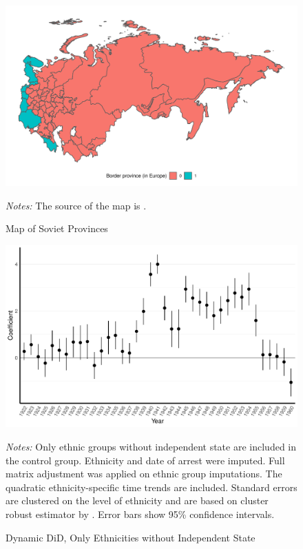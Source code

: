  \begin{figure}[H]
\centering
\caption{Map of Soviet Provinces}
\includegraphics[width=\textwidth]{plots/final/border_provinces_map.pdf}
\begin{minipage}{0.92\textwidth}
\footnotesize
\emph{Notes:} The source of the map is \citet{sablin_transcultural_2018}.  
\end{minipage}
\label{fig:map}
\end{figure}

 \begin{figure}[H]
\centering
\caption{Dynamic DiD, Only Ethnicities without Independent State}
\includegraphics[width=\textwidth]{plots/final/pr_cr2_date_imp_full_years_no_trends_not_ind_country.pdf}
\begin{minipage}{0.92\textwidth}
\footnotesize
\emph{Notes:} Only ethnic groups without independent state are included in the control group. Ethnicity and date of arrest were imputed.  Full matrix adjustment was applied on ethnic group imputations. The quadratic ethnicity-specific time trends are included.  Standard errors are clustered on the level of ethnicity and are based on cluster robust estimator by \citet{pustejovsky_small-sample_2018}. Error bars show 95\% confidence intervals. 
\end{minipage}
\label{fig:did_effets_no_ind_countries}
\end{figure}

